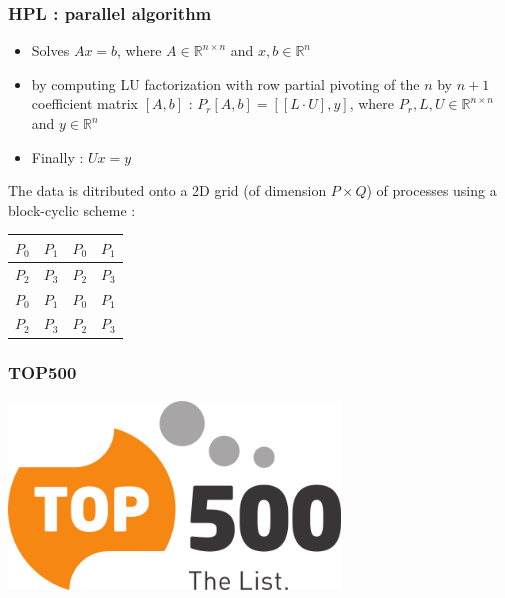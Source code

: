 \begin{frame}[containsverbatim]
\frametitle{HPL : parallel algorithm}
\begin{itemize}
	\item{Solves $A x = b$, where  $A \in \mathbb{R}^{n \times n}$ and $x,b \in \mathbb{R}^n$}
	\item{by computing LU factorization with row partial pivoting of the $n$ by $n+1$ coefficient matrix $[A,b]$ : $P_r[A,b] = [[L \cdot U],y]$, where $P_r,L,U \in \mathbb{R}^{n \times n}$ and $y \in \mathbb{R}^n$}
	\item{Finally : $U x = y$}
\end{itemize}
The data is ditributed onto a 2D grid (of dimension $P\times Q$) of processes using a block-cyclic scheme :
\begin{center}
\begin{tabular}{| p{0.5cm} | p{0.5cm} | p{0.5cm} | p{0.5cm} |}
\hline
$P_0$ & $P_1$ & $P_0$ & $P_1$ \\
\hline
$P_2$ & $P_3$ & $P_2$ & $P_3$ \\
\hline
$P_0$ & $P_1$ & $P_0$ & $P_1$ \\
\hline
$P_2$ & $P_3$ & $P_2$ & $P_3$ \\
\hline
\end{tabular}
\end{center}
\end{frame}




\begin{frame}[containsverbatim]
\frametitle{TOP500}
\begin{center}
        {\includegraphics[height=5cm]{Day0/images/Top500_logo.png}}
\end{center}
\end{frame}


